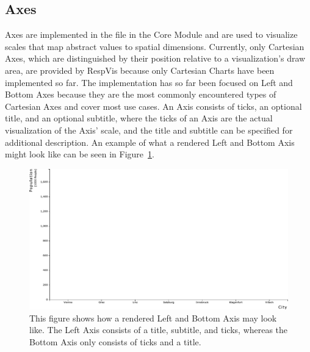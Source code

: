 \subsection{Axes}

Axes are implemented in the  file in the Core Module and are used to visualize scales that map abstract values to spatial dimensions.
Currently, only Cartesian Axes, which are distinguished by their position relative to a visualization's draw area, are provided by RespVis because only Cartesian Charts have been implemented so far.
The implementation has so far been focused on Left and Bottom Axes because they are the most commonly encountered types of Cartesian Axes and cover most use cases. 
An Axis consists of ticks, an optional title, and an optional subtitle, where the ticks of an Axis are the actual visualization of the Axis' scale, and the title and subtitle can be specified for additional description.
An example of what a rendered Left and Bottom Axis might look like can be seen in Figure~\ref{fig:Axes}. 

\begin{figure}[tp]
\centering
\includegraphics[keepaspectratio,width=\linewidth,height=\fullh]{diagrams/axes.pdf}
\caption[RespVis Axis Components]{
  This figure shows how a rendered Left and Bottom Axis may look like.
  The Left Axis consists of a title, subtitle, and ticks, whereas the Bottom Axis only consists of ticks and a title. 
}
\label{fig:Axes}
\end{figure}
  

